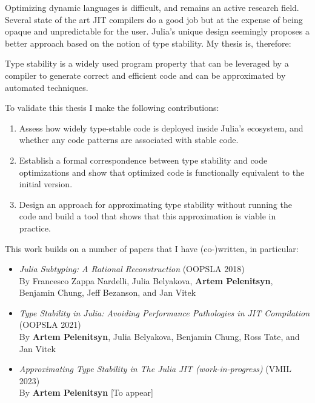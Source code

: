Optimizing dynamic languages is difficult, and remains an active research field.
Several state of the art JIT compilers do a good job but at the expense of being
opaque and unpredictable for the user.
Julia's unique design seemingly proposes a better approach based on the notion
of type stability. My thesis is, therefore:

\begin{itquote}
Type stability
is a widely used program property that can be leveraged by a compiler to generate
correct and efficient code
and can be approximated by automated techniques.
\end{itquote}

To validate this thesis I make the following contributions:
\begin{enumerate}

  \item
  Assess how widely type-stable code is deployed inside Julia's ecosystem, and
  whether any code patterns are associated with stable code.

  \item
  Establish a formal correspondence between type stability and code optimizations and
  show that optimized code is functionally equivalent to the initial version.

  \item
  Design an approach for approximating type stability without running the code and
  build a tool that shows that this approximation is viable in practice.
\end{enumerate}


This work builds on a number of papers that I have (co-)written, in particular:
\begin{itemize}
  \item \emph{Julia Subtyping: A Rational Reconstruction} (OOPSLA 2018)\\
  By Francesco Zappa Nardelli, Julia Belyakova, \textbf{Artem Pelenitsyn},
  Benjamin Chung, Jeff Bezanson, and Jan Vitek~\cite{oopsla18b}

  \item \emph{Type Stability in Julia: Avoiding Performance Pathologies in JIT
  Compilation} (OOPSLA 2021)\\
  By \textbf{Artem Pelenitsyn}, Julia Belyakova, Benjamin Chung, Ross Tate, and Jan
  Vitek~\cite{Pelenitsyn21}

  \item \emph{Approximating Type Stability in The Julia JIT (work-in-progress)} (VMIL 2023)\\
  By \textbf{Artem Pelenitsyn} [To appear]
\end{itemize}
